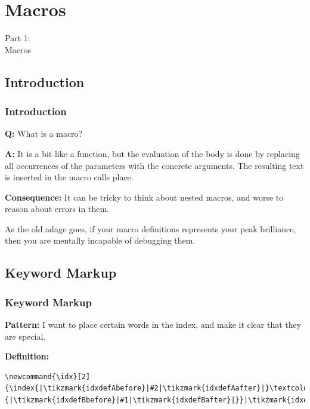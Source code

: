 {
\renewcommand{\bgcolor}{macros}

\section{Macros}
\begin{frame}
  \vspace{25mm}
  \begin{center}
    \Huge{Part 1\pause:\\Macros}
  \end{center}
\end{frame}

\subsection{Introduction}
\begin{frame}[fragile]
  \frametitle{Introduction}
  \vspace{3mm}
  \textbf{Q:} What is a macro?
  
  \pause
  \vspace{5mm}
  \textbf{A:} It is a bit like a function, but the evaluation of the body is done by replacing all occurrences of the parameters with the concrete arguments. The resulting text is inserted in the macro calls place.
  
  \pause
  \vspace{5mm}
  \textbf{Consequence:} It can be tricky to think about nested macros, and worse to reason about errors in them.
  
  \pause
  \vspace{5mm}
  As the old adage goes, if your macro definitions represents your peak brilliance, then you are mentally incapable of debugging them.
\end{frame}

\subsection{Keyword Markup}
\begin{frame}[fragile]
  \frametitle{Keyword Markup}
  \vspace{3mm}
  \textbf{Pattern:} I want to place certain words in the index, and make it clear that they are special.
  
  \pause
  \vspace{5mm}
  \textbf{Definition:}
  \begin{verbatim}
\newcommand{\idx}[2]{\index{|\tikzmark{idxdefAbefore}|#2|\tikzmark{idxdefAafter}|}\textcolor{purple}{|\tikzmark{idxdefBbefore}|#1|\tikzmark{idxdefBafter}|}}|\tikzmark{idxeol}|
  \end{verbatim}
  

\end{frame}}
